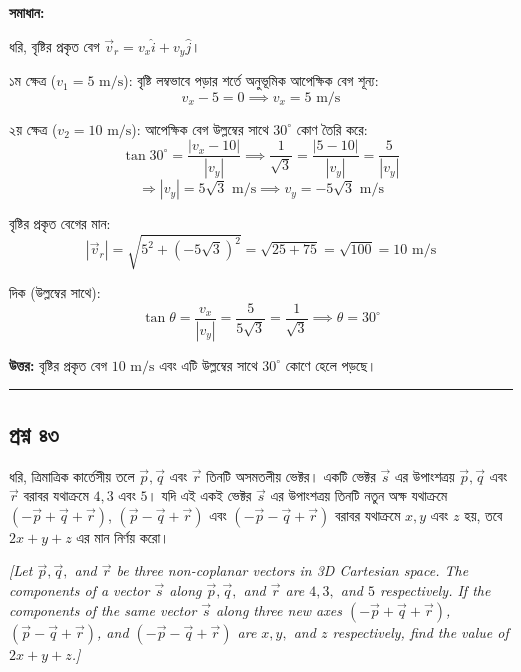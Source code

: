 \documentclass[11pt,a4paper]{article}
\begin{document}
\textbf{সমাধান:}

ধরি, বৃষ্টির প্রকৃত বেগ $\vec{v}_r = v_x\hat{i} + v_y\hat{j}$।

১ম ক্ষেত্র ($v_1 = 5\text{ m/s}$):
বৃষ্টি লম্বভাবে পড়ার শর্তে অনুভূমিক আপেক্ষিক বেগ শূন্য:
$$v_x - 5 = 0 \implies v_x = 5\text{ m/s}$$

২য় ক্ষেত্র ($v_2 = 10\text{ m/s}$):
আপেক্ষিক বেগ উল্লম্বের সাথে $30^\circ$ কোণ তৈরি করে:
$$\tan 30^\circ = \frac{|v_x - 10|}{|v_y|} \implies \frac{1}{\sqrt{3}} = \frac{|5 - 10|}{|v_y|} = \frac{5}{|v_y|}$$
$$\Rightarrow |v_y| = 5\sqrt{3}\text{ m/s} \implies v_y = -5\sqrt{3}\text{ m/s}$$

বৃষ্টির প্রকৃত বেগের মান:
$$|\vec{v}_r| = \sqrt{5^2 + (-5\sqrt{3})^2} = \sqrt{25 + 75} = \sqrt{100} = 10\text{ m/s}$$

দিক (উল্লম্বের সাথে):
$$\tan\theta = \frac{v_x}{|v_y|} = \frac{5}{5\sqrt{3}} = \frac{1}{\sqrt{3}} \implies \theta = 30^\circ$$

\textbf{উত্তর:} বৃষ্টির প্রকৃত বেগ $10\text{ m/s}$ এবং এটি উল্লম্বের সাথে $30^\circ$ কোণে হেলে পড়ছে।

\vspace{0.5cm}
\hrule
\vspace{0.5cm}

\subsection*{প্রশ্ন ৪৩}

ধরি, ত্রিমাত্রিক কার্তেসীয় তলে $\vec{p}, \vec{q}$ এবং $\vec{r}$ তিনটি অসমতলীয় ভেক্টর। একটি ভেক্টর $\vec{s}$ এর উপাংশত্রয় $\vec{p}, \vec{q}$ এবং $\vec{r}$ বরাবর যথাক্রমে $4, 3$ এবং $5$। যদি এই একই ভেক্টর $\vec{s}$ এর উপাংশত্রয় তিনটি নতুন অক্ষ যথাক্রমে $(-\vec{p}+\vec{q}+\vec{r})$, $(\vec{p}-\vec{q}+\vec{r})$ এবং $(-\vec{p}-\vec{q}+\vec{r})$ বরাবর যথাক্রমে $x, y$ এবং $z$ হয়, তবে $2x+y+z$ এর মান নির্ণয় করো।

\smallskip
\textit{[Let $\vec{p}, \vec{q},$ and $\vec{r}$ be three non-coplanar vectors in 3D Cartesian space. The components of a vector $\vec{s}$ along $\vec{p}, \vec{q},$ and $\vec{r}$ are $4, 3,$ and $5$ respectively. If the components of the same vector $\vec{s}$ along three new axes $(-\vec{p}+\vec{q}+\vec{r})$, $(\vec{p}-\vec{q}+\vec{r})$, and $(-\vec{p}-\vec{q}+\vec{r})$ are $x, y,$ and $z$ respectively, find the value of $2x+y+z$.]}
\end{document}
